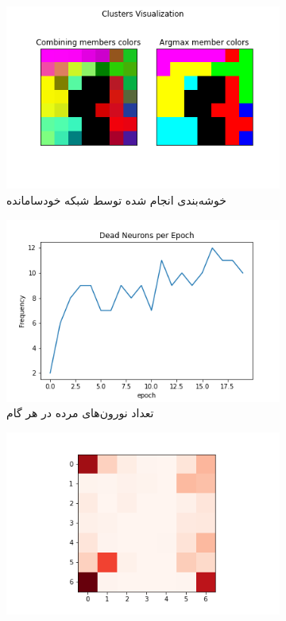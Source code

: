 \documentclass[12pt, a4paper]{article}
\begin{document}
\clearpage

\begin{figure}[h]
    \begin{subfigure}{\linewidth}
        \centering
        \includegraphics[width=0.8\linewidth]{images/q5/r8/cluster.png}
        \caption{خوشه‌بندی انجام شده توسط شبکه خودسامانده}
    \end{subfigure}
    \newline
    \begin{subfigure}{0.45\linewidth}
        \includegraphics[width=\linewidth]{images/q5/r8/dead.png}
        \caption{تعداد نورون‌های مرده در هر گام}
    \end{subfigure}
    \hfill
    \begin{subfigure}{0.45\linewidth}
        \includegraphics[width=\linewidth]{images/q5/r8/umatrix.png}

\end{subfigure}
\end{figure}
\end{document}
